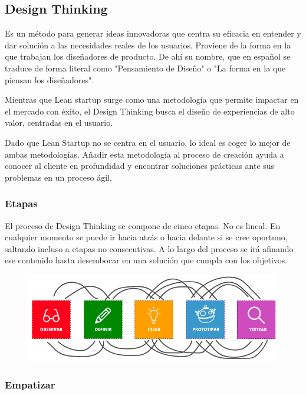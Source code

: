 \documentclass[12pt,twoside,titlepage]{report}
\begin{document}
\subsection{Design Thinking}

Es un método para generar ideas innovadoras que centra su eficacia en entender y dar solución a las necesidades reales de los usuarios. Proviene de la forma en la que trabajan los diseñadores de producto. De ahí su nombre, que en español se traduce de forma literal como "Pensamiento de Diseño" o "La forma en la que piensan los diseñadores".

Mientras que Lean startup surge como una metodología que permite impactar en el mercado con éxito, el Design Thinking busca el diseño de experiencias de alto valor, centradas en el usuario.

Dado que Lean Startup no se centra en el usuario, lo ideal es coger lo mejor de ambas metodologías. Añadir esta metodología al proceso de creación ayuda a conocer al cliente en profundidad y encontrar soluciones prácticas ante sus problemas en un proceso ágil.

\subsubsection{Etapas}

El proceso de Design Thinking se compone de cinco etapas. No es lineal. En cualquier momento se puede ir hacia atrás o hacia delante si se cree oportuno, saltando incluso a etapas no consecutivas. A lo largo del proceso se irá afinando ese contenido hasta desembocar en una solución que cumpla con los objetivos. 

\begin{figure}[H] 
    \includegraphics[scale=0.44]{designthinking}
    \centering
    \label{fig:Design Thinking}
\end{figure}

\subsubsection{Empatizar}
\end{document}
